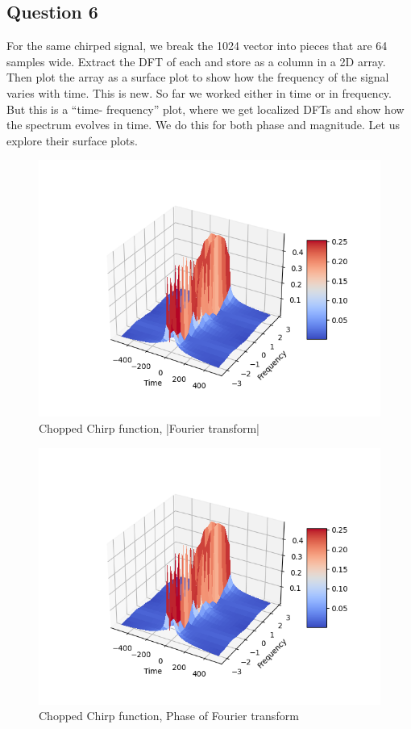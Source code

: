 \documentclass{article}
\begin{document}
\subsection{Question 6}
For the same chirped signal, we break the 1024 vector into pieces that are 64 samples wide.
Extract the DFT of each and store as a column in a 2D array. Then plot the array as a surface plot to show how the frequency of the signal varies with time.
This is new. So far we worked either in time or in frequency. But this is a “time- frequency” plot, where we get localized DFTs and show how the spectrum evolves in time.
We do this for both phase and magnitude. Let us explore their surface plots.

\begin{figure}[h!]
\centering
\includegraphics[scale=0.6]{chirp_mag.png}
\caption{Chopped Chirp function, |Fourier transform|}
\label{fig:universe}
\end{figure}

\begin{figure}[h!]
\centering
\includegraphics[scale=0.6]{chirp_mag.png}
\caption{Chopped Chirp function, Phase of Fourier transform}
\label{fig:universe}
\end{figure}
\end{document}
